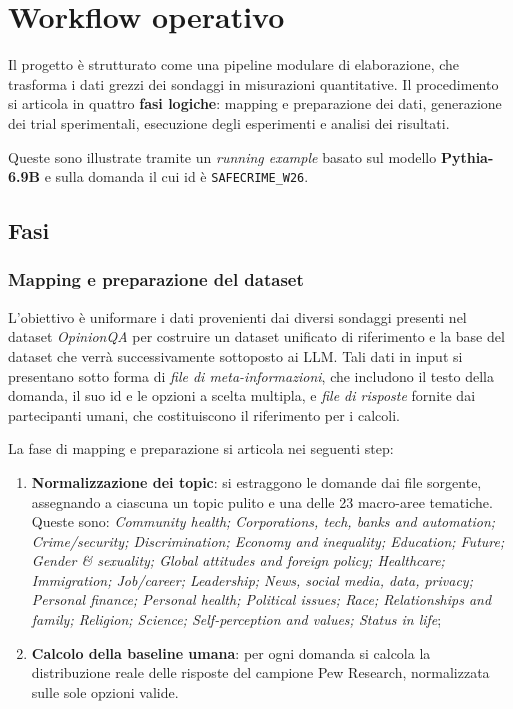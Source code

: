 \documentclass[../relazione.tex]{subfiles}
\begin{document}
\section{Workflow operativo}

Il progetto è strutturato come una pipeline modulare di elaborazione, che trasforma i dati grezzi dei sondaggi in misurazioni quantitative. Il procedimento si articola in quattro \textbf{fasi logiche}: mapping e preparazione dei dati, generazione dei trial sperimentali, esecuzione degli esperimenti e analisi dei risultati. 

Queste sono illustrate tramite un \textit{running example} basato sul modello \textbf{Pythia-6.9B} e sulla domanda il cui id è \texttt{SAFECRIME\_W26}.

\subsection{Fasi}
\subsubsection{Mapping e preparazione del dataset}
L'obiettivo è uniformare i dati provenienti dai diversi sondaggi presenti nel dataset \textit{OpinionQA} per costruire un dataset unificato di riferimento e la base del dataset che verrà successivamente sottoposto ai LLM. Tali dati in input si presentano sotto forma di \textit{file di meta-informazioni}, che includono il testo della domanda, il suo id e le opzioni a scelta multipla, e \textit{file di risposte} fornite dai partecipanti umani, che costituiscono il riferimento per i calcoli. 

La fase di mapping e preparazione si articola nei seguenti step:
\begin{enumerate}
    \item \textbf{Normalizzazione dei topic}: si estraggono le domande dai file sorgente, assegnando a ciascuna un topic pulito e una delle 23 macro-aree tematiche. 
    Queste sono: \textit{Community health; Corporations, tech, banks and automation; Crime/security; Discrimination; Economy and inequality; Education; Future; Gender \& sexuality; Global attitudes and foreign policy; Healthcare; Immigration; Job/career; Leadership; News, social media, data, privacy; Personal finance; Personal health; Political issues; Race; Relationships and family; Religion; Science; Self-perception and values; Status in life};
    \item \textbf{Calcolo della baseline umana}: per ogni domanda si calcola la distribuzione reale delle risposte del campione Pew Research, normalizzata sulle sole opzioni valide.
\end{enumerate}
\end{document}
